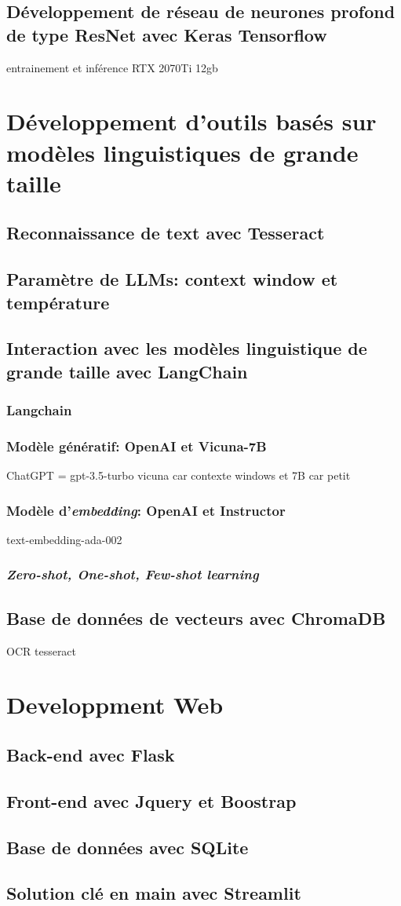 \subsection{Développement de réseau de neurones profond de type ResNet avec Keras Tensorflow}
entrainement et inférence RTX 2070Ti 12gb
\section{Développement d'outils basés sur modèles linguistiques de grande taille}
\subsection{Reconnaissance de text avec Tesseract}
\subsection{Paramètre de LLMs: context window et température}
\subsection{Interaction avec les modèles linguistique de grande taille avec LangChain}
\subsubsection{Langchain}
\subsubsection{Modèle génératif: OpenAI et Vicuna-7B}
ChatGPT = gpt-3.5-turbo
vicuna car contexte windows et 7B car petit
\subsubsection{Modèle d'\textit{embedding}: OpenAI et Instructor}
text-embedding-ada-002
\subsubsection{\textit{Zero-shot, One-shot, Few-shot learning}}
\subsection{Base de données de vecteurs avec ChromaDB}
OCR tesseract
\section{Developpment Web}
\subsection{Back-end avec Flask}
\subsection{Front-end avec Jquery et Boostrap}
\subsection{Base de données avec SQLite}
\subsection{Solution clé en main avec Streamlit}
